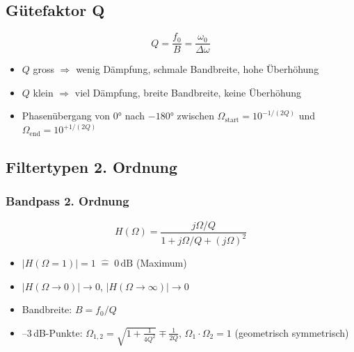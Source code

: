\documentclass[a4paper,12pt]{article}
\begin{document}
	\subsection{Gütefaktor Q}
	
	\begin{equation}
		Q = \frac{f_0}{B} = \frac{\omega_0}{\Delta\omega}
	\end{equation}
	
	\begin{itemize}
		\item $Q$ gross $\Rightarrow$ wenig Dämpfung, schmale Bandbreite, hohe Überhöhung
		\item $Q$ klein $\Rightarrow$ viel Dämpfung, breite Bandbreite, keine Überhöhung
		\item Phasenübergang von $0°$ nach $-180°$ zwischen
		$\Omega_\text{start} = 10^{-1/(2Q)}$ und $\Omega_\text{end} = 10^{+1/(2Q)}$
	\end{itemize}
	
	
	\subsection{Filtertypen 2. Ordnung}
	
	\subsubsection{Bandpass 2. Ordnung}
	\begin{equation}
		H(\Omega) = \frac{j\Omega/Q}{1 + j\Omega/Q + (j\Omega)^2}
	\end{equation}
	\begin{itemize}
		\item $|H(\Omega=1)| = 1 \;\widehat{=}\; 0\,\text{dB}$ (Maximum)
		\item $|H(\Omega\to 0)| \to 0$, $|H(\Omega\to\infty)| \to 0$
		\item Bandbreite: $B = f_0/Q$
		\item --3\,dB-Punkte: $\Omega_{1,2} = \sqrt{1+\frac{1}{4Q^2}} \mp \frac{1}{2Q}$, \quad $\Omega_1 \cdot \Omega_2 = 1$ (geometrisch symmetrisch)
	\end{itemize}
	
\end{document}
